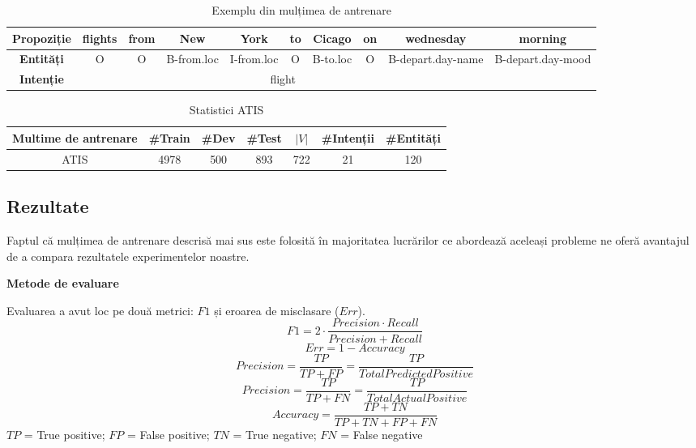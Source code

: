 \begin{table}[h]
	\centering
	\caption{Exemplu din mulțimea de antrenare}
	\label{atis_example}
	\begin{adjustbox}{max width=\textwidth}
		\begin{tabular}{ |c|c|c|c|c|c|c|c|c|c| } 
			\hline
			\textbf{Propoziție} & flights & from & New & York & to & Cicago & on & wednesday & morning \\ 
			\hline
			\textbf{Entități} & O & O & B-from.loc & I-from.loc & O & B-to.loc & O & B-depart.day-name & B-depart.day-mood \\
			\hline
			\textbf{Intenție} & \multicolumn{8}{c}{flight} &  \\ 
			\hline
		\end{tabular}
	\end{adjustbox}
\end{table}

\begin{table}[h]
	\centering
	\caption{Statistici ATIS}
	\label{atis_stats}
	\begin{adjustbox}{max width=\textwidth}
		\begin{tabular}{ |c|c|c|c|c|c|c| } 
			\hline
			\textbf{Multime de antrenare} & \#Train & \#Dev & \#Test & $|V|$ & \#Intenții & \#Entități \\ 
			\hline
			ATIS & 4978 & 500 & 893 & 722 & 21 & 120 \\
			\hline
		\end{tabular}
	\end{adjustbox}
\end{table}


\subsection{Rezultate}
Faptul că mulțimea de antrenare descrisă mai sus este folosită în majoritatea lucrărilor ce abordează aceleași probleme ne oferă avantajul de a compara rezultatele experimentelor noastre.

\textbf{Metode de evaluare}

Evaluarea a avut loc pe două metrici: $F1$ și eroarea de misclasare ($Err$).
$$ F1 = 2 \cdot \frac{Precision \cdot Recall}{Precision + Recall} $$
$$ Err = 1 - Accuracy $$
$$ Precision = \frac{TP}{TP+FP} = \frac{TP}{Total Predicted Positive} $$
$$ Precision = \frac{TP}{TP+FN} = \frac{TP}{Total Actual Positive} $$
$$ Accuracy = \frac{TP+TN}{TP + TN + FP + FN} $$
$TP$ = True positive; $FP$ = False positive; $TN$ = True negative; $FN$ = False negative

